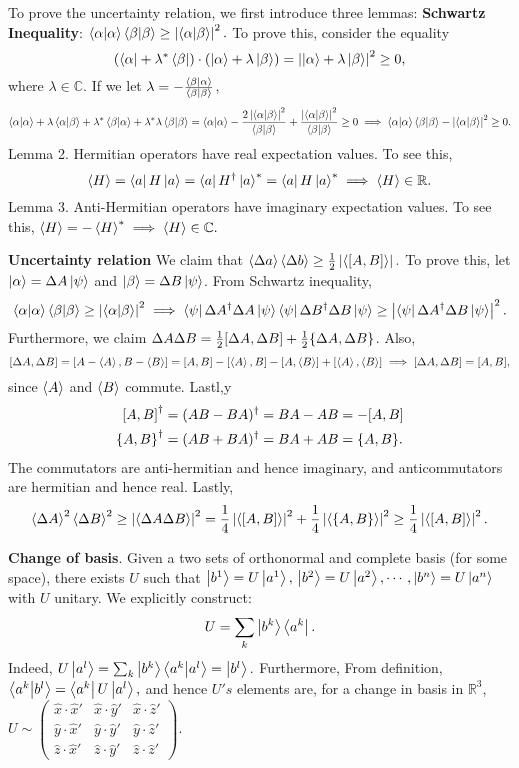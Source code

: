 \documentclass{article}
\begin{document}
To prove the uncertainty relation, we first introduce three lemmas:
\textbf{Schwartz Inequality}: $\braket\alpha\braket\beta\ge\left\lvert\braket{\alpha}{\beta}\right\rvert^2.$ To prove this, consider the equality 
$$\left(\bra\alpha+\lambda^*\bra\beta\right)\cdot\left(\ket\alpha+\lambda\ket\beta\right)=\left\lvert\ket\alpha+\lambda\ket\beta\right\rvert^2\ge 0,$$
where $\lambda\in\mathbb C$. If we let $\lambda=-\frac{\braket{\beta}{\alpha}}{\braket\beta}$,
$$\braket\alpha+\lambda\braket{\alpha}{\beta}+\lambda^*\braket{\beta}{\alpha}+\lambda^*\lambda\braket\beta=\braket\alpha-\frac{2\left\lvert\braket{\alpha}{\beta}\right\rvert^2}{\braket\beta}+\frac{\left\lvert\braket{\alpha}{\beta}\right\rvert^2}{\braket\beta}\ge 0\implies\braket\alpha\braket\beta-\left\lvert\braket{\alpha}{\beta}\right\rvert^2\ge 0.$$
Lemma 2. Hermitian operators have real expectation values. To see this, 
$$\ev H=\bra aH\ket a=\bra aH^\dag\ket{a}^*=\bra aH\ket{a}^*\implies\ev H\in\mathbb R.$$
Lemma 3. Anti-Hermitian operators have imaginary expectation values. To see this, $\ev H=-\ev{H}^*\implies \ev H\in\mathbb C.$

\textbf{Uncertainty relation} We claim that $\ev{\Delta a}\ev{\Delta b}\ge \frac 12\abs{\ev{\comm{A}{B}}}.$ To prove this, let  $\ket\alpha=\Delta A\ket\psi$ and $\ket\beta=\Delta B\ket\psi$. From Schwartz inequality, 
$$\braket\alpha\braket\beta\ge\left\lvert\braket{\alpha}{\beta}\right\rvert^2\implies\bra\psi\Delta A^\dag\Delta A\ket\psi\bra\psi\Delta B^\dag\Delta B\ket\psi\ge\left\lvert\bra\psi\Delta A^\dag\Delta B\ket\psi\right\rvert^2.$$
Furthermore, we claim $\Delta A\Delta B=\frac 12\comm{\Delta A}{\Delta B}+\frac 12\acomm{\Delta A}{\Delta B}$. Also, 
$$\comm{\Delta A}{\Delta B}=\comm{A-\ev A}{B-\ev B}=\comm{A}{B}-\comm{\ev A}{B}-\comm{A}{\ev B}+\comm{\ev A}{\ev B}\implies\comm{\Delta A}{\Delta B}=\comm{A}{B},$$  since $\ev A$ and $\ev B$ commute. Lastl,y
\begin{align*}
    \comm{A}{B}^\dag&=(AB-BA)^\dag=BA-AB=-\comm{A}{B}\\
    \acomm{A}{B}^\dag&=(AB+BA)^\dag=BA+AB=\acomm{A}{B}.
\end{align*}
The commutators are anti-hermitian and hence imaginary, and anticommutators are hermitian and hence real. Lastly,
$$\ev{\Delta A}^2\ev{\Delta B}^2\ge\abs{\ev{\Delta A\Delta B}}^2=\frac 14\abs{\ev{\comm{A}{B}}}^2+\frac 14\abs{\ev{\acomm{A}{B}}}^2\ge \frac 14\abs{\ev{\comm{A}{B}}}^2.$$

\textbf{Change of basis}. Given a two sets of orthonormal and complete basis (for some space), there exists $U$ such that $\ket{b^1}=U\ket{a^1},\,\ket{b^2}=U\ket{a^2},\cdots,\ket{b^n}=U\ket{a^n}$ with $U$ unitary. We explicitly construct:
$$U=\sum_k\ket{b^k}\bra{a^k}.$$
Indeed, $U\ket{a^l}=\sum_k\ket{b^k}\braket{a^k}{a^l}=\ket{b^l}.$ Furthermore, 
From definition, $\braket{a^k}{b^l}=\bra{a^k}U\ket{a^l},$ and hence $U's$ elements are, for a change in basis in $\mathbb R^3$, $U\sim \begin{pmatrix}\hat x\cdot\hat x'&\hat x\cdot\hat y'&\hat x\cdot\hat z'\\\hat y\cdot\hat x'&\hat y\cdot\hat y'&\hat y\cdot\hat z'\\\hat z\cdot\hat x'&\hat z\cdot\hat y'&\hat z\cdot\hat z'\end{pmatrix}.$
\end{document}
